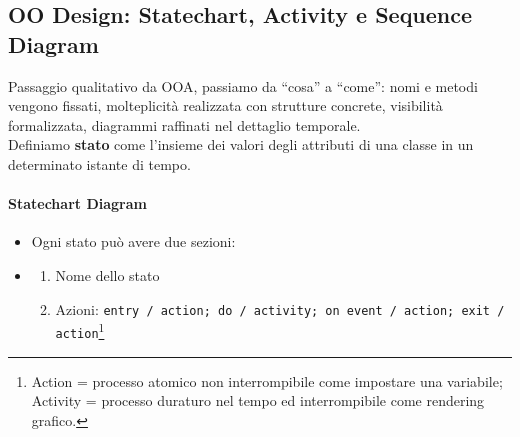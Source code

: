 \documentclass[12pt]{extarticle}
\begin{document}
\clearpage

\subsection{OO Design: Statechart, Activity e Sequence Diagram} Passaggio qualitativo da OOA, passiamo da ``cosa'' a ``come'': nomi e metodi vengono fissati, molteplicità realizzata con strutture concrete, visibilità formalizzata, diagrammi raffinati nel dettaglio temporale.\\

\noindent Definiamo \textbf{stato} come l'insieme dei valori degli attributi di una classe in un determinato istante di tempo. 

\paragraph{Statechart Diagram}
\begin{itemize}
    \item Ogni stato può avere due sezioni:
    \item \begin{enumerate}
        \item Nome dello stato
        \item Azioni: \texttt{entry / action; do / activity; on event / action; exit / action}\footnote{Action = processo atomico non interrompibile come impostare una variabile; Activity = processo duraturo nel tempo ed interrompibile come rendering grafico.}
    \end{enumerate}
\end{itemize}
\begin{figure}[htbp]
\centering
{}
\label{fig:state_syntax_internal}
\end{figure}
\end{document}
